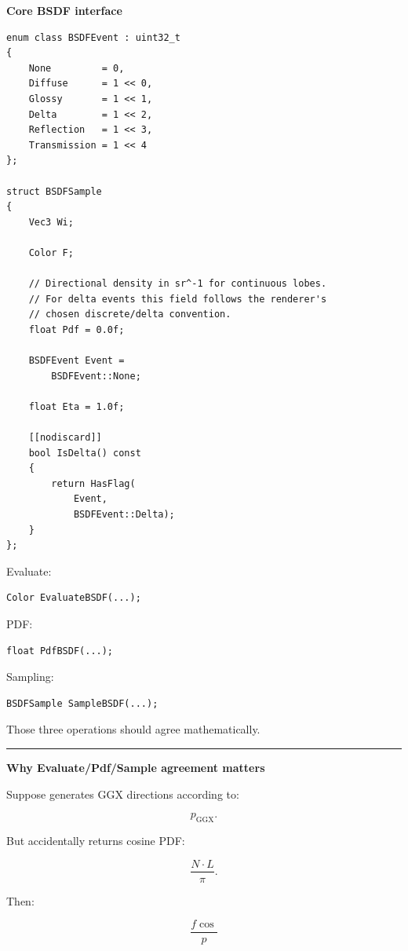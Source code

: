 \textbf{Core BSDF interface}

\begin{verbatim}
enum class BSDFEvent : uint32_t
{
    None         = 0,
    Diffuse      = 1 << 0,
    Glossy       = 1 << 1,
    Delta        = 1 << 2,
    Reflection   = 1 << 3,
    Transmission = 1 << 4
};

struct BSDFSample
{
    Vec3 Wi;

    Color F;

    // Directional density in sr^-1 for continuous lobes.
    // For delta events this field follows the renderer's
    // chosen discrete/delta convention.
    float Pdf = 0.0f;

    BSDFEvent Event =
        BSDFEvent::None;

    float Eta = 1.0f;

    [[nodiscard]]
    bool IsDelta() const
    {
        return HasFlag(
            Event,
            BSDFEvent::Delta);
    }
};
\end{verbatim}

Evaluate:

\begin{verbatim}
Color EvaluateBSDF(...);
\end{verbatim}

PDF:

\begin{verbatim}
float PdfBSDF(...);
\end{verbatim}

Sampling:

\begin{verbatim}
BSDFSample SampleBSDF(...);
\end{verbatim}

Those three operations should agree mathematically.

\begin{center}\rule{0.5\linewidth}{0.5pt}\end{center}

\textbf{Why Evaluate/Pdf/Sample agreement matters}

Suppose  generates GGX directions according to:

\[
p_{\text{GGX}}.
\]

But  accidentally returns cosine PDF:

\[
\frac{N\cdot L}{\pi}.
\]

Then:

\[
\frac{f\cos}{p}
\]

